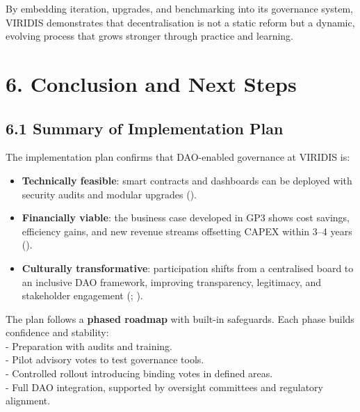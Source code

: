 \documentclass[
  english,
  12pt,
  oneside,
  open=any]{scrbook}
\providecommand{\tightlist}{%
  \setlength{\itemsep}{0pt}\setlength{\parskip}{0pt}}\usepackage{longtable,booktabs,array}
\begin{document}
By embedding iteration, upgrades, and benchmarking into its governance
system, VIRIDIS demonstrates that decentralisation is not a static
reform but a dynamic, evolving process that grows stronger through
practice and learning.

\section{6. Conclusion and Next Steps}\label{sec-conclusion}

\subsection{6.1 Summary of Implementation Plan}\label{sec-summary}

The implementation plan confirms that DAO-enabled governance at VIRIDIS
is:

\begin{itemize}
\tightlist
\item
  \textbf{Technically feasible}: smart contracts and dashboards can be
  deployed with security audits and modular upgrades
  ().\\
\item
  \textbf{Financially viable}: the business case developed in GP3 shows
  cost savings, efficiency gains, and new revenue streams offsetting
  CAPEX within 3--4 years
  ().\\
\item
  \textbf{Culturally transformative}: participation shifts from a
  centralised board to an inclusive DAO framework, improving
  transparency, legitimacy, and stakeholder engagement
  (;
  ).
\end{itemize}

The plan follows a \textbf{phased roadmap} with built-in safeguards.
Each phase builds confidence and stability:\\
- Preparation with audits and training.\\
- Pilot advisory votes to test governance tools.\\
- Controlled rollout introducing binding votes in defined areas.\\
- Full DAO integration, supported by oversight committees and regulatory
alignment.
\end{document}
